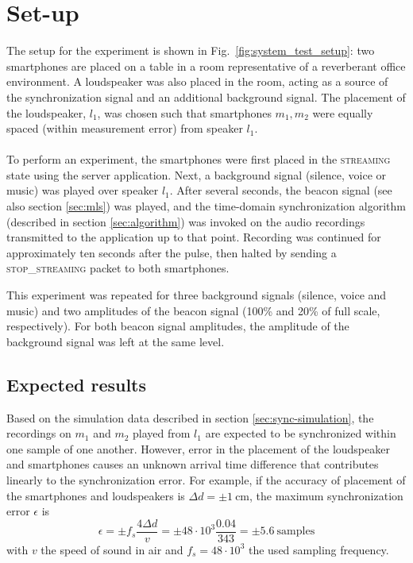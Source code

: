 \documentclass[a4paper, notitlepage]{report}
\begin{document}
\section{Set-up}
The setup for the experiment is shown in Fig.~\ref{fig:system_test_setup}: two smartphones are placed on a table in a room representative of a reverberant office environment. A loudspeaker was also placed in the room, acting as a source of the synchronization signal and an additional background signal. The placement of the loudspeaker, $l_1$, was chosen such that smartphones $m_1, m_2$ were equally spaced (within measurement error) from speaker $l_1$.

\paragraph*{}
To perform an experiment, the smartphones were first placed in the \textsc{streaming} state using the \matlab server application. Next, a background signal (silence, voice or music) was played over speaker $l_1$. After several seconds, the beacon signal (see also section \ref{sec:mls}) was played, and the time-domain synchronization algorithm (described in section \ref{sec:algorithm}) was invoked on the audio recordings transmitted to the \matlab application up to that point. Recording was continued for approximately ten seconds after the pulse, then halted by sending a \textsc{stop\_streaming} packet to both smartphones.

This experiment was repeated for three background signals (silence, voice and music) and two amplitudes of the beacon signal (100\% and 20\% of full scale, respectively). For both beacon signal amplitudes, the amplitude of the background signal was left at the same level.

\subsection{Expected results}
Based on the simulation data described in section \ref{sec:sync-simulation}, the recordings on $m_1$ and $m_2$ played from $l_1$ are expected to be synchronized within one sample of one another. However, error in the placement of the loudspeaker and smartphones causes an unknown arrival time difference that contributes linearly to the synchronization error. For example, if the accuracy of placement of the smartphones and loudspeakers is $\Delta d = \pm1~\mathrm{cm}$, the maximum synchronization error $\epsilon$ is
$$
\epsilon = \pm f_s\frac{4\Delta d}{v} = \pm 48\cdot10^3\frac{0.04}{343} = \pm 5.6~\mathrm{samples}
$$
with $v$ the speed of sound in air and $f_s=48\cdot10^3$ the used sampling frequency. 
\end{document}
